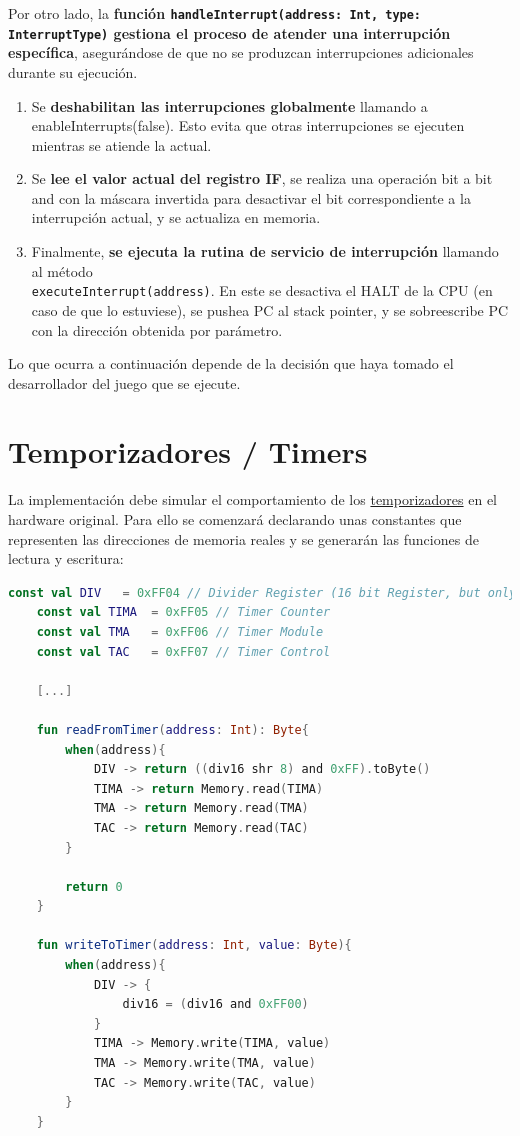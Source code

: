Por otro lado, la \textbf{función \texttt{handleInterrupt(address: Int, type: InterruptType)} gestiona el proceso de atender una interrupción específica}, asegurándose de que no se produzcan interrupciones adicionales durante su ejecución.

\begin{enumerate}
    \item Se \textbf{deshabilitan las interrupciones globalmente} llamando a enableInterrupts(false). Esto evita que otras interrupciones se ejecuten mientras se atiende la actual.
    \item Se \textbf{lee el valor actual del registro IF}, se realiza una operación bit a bit and con la máscara invertida para desactivar el bit correspondiente a la interrupción actual, y se actualiza en memoria.
    \item Finalmente, \textbf{se ejecuta la rutina de servicio de interrupción} llamando al método \\
    \texttt{executeInterrupt(address)}. En este se desactiva el HALT de la CPU (en caso de que lo estuviese), se pushea PC al stack pointer, y se sobreescribe PC con la dirección obtenida por parámetro. 
\end{enumerate}

Lo que ocurra a continuación depende de la decisión que haya tomado el desarrollador del juego que se ejecute.

\section{Temporizadores / Timers}

La implementación debe simular el comportamiento de los \hyperref[history_timer]{temporizadores} en el hardware original. Para ello se comenzará declarando unas constantes que representen las direcciones de memoria reales y se generarán las funciones de lectura y escritura:\label{writeToTimer}

\begin{lstlisting}[language=Kotlin, caption={Lectura y escritura en registros de Timers.}, label={code:timerwriteread}]
    const val DIV   = 0xFF04 // Divider Register (16 bit Register, but only the upper 8 bit (0-7) are public to the developer)
    const val TIMA  = 0xFF05 // Timer Counter
    const val TMA   = 0xFF06 // Timer Module
    const val TAC   = 0xFF07 // Timer Control

    [...]

    fun readFromTimer(address: Int): Byte{
        when(address){
            DIV -> return ((div16 shr 8) and 0xFF).toByte()
            TIMA -> return Memory.read(TIMA)
            TMA -> return Memory.read(TMA)
            TAC -> return Memory.read(TAC)
        }

        return 0
    }

    fun writeToTimer(address: Int, value: Byte){
        when(address){
            DIV -> {
                div16 = (div16 and 0xFF00)
            }
            TIMA -> Memory.write(TIMA, value)
            TMA -> Memory.write(TMA, value)
            TAC -> Memory.write(TAC, value)
        }
    }
\end{lstlisting}

